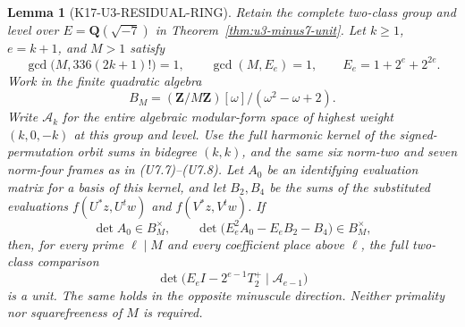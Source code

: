 \documentclass[11pt,a4paper]{article}
\newtheorem{lemma}[theorem]{Lemma}
\theoremstyle{definition}
\begin{document}
\begin{lemma}[K17-U3-RESIDUAL-RING]\label{lem:u3-residual-ring}
Retain the complete two-class group and level over
$E=\mathbf Q(\sqrt{-7})$ in Theorem~\ref{thm:u3-minus7-unit}.
Let $k\ge1$, $e=k+1$, and $M>1$ satisfy
\[
 \gcd\bigl(M,336(2k+1)!\bigr)=1,
 \qquad \gcd(M,E_e)=1,
 \qquad E_e=1+2^e+2^{2e}.
 \tag{UR.1}
\]
Work in the finite quadratic algebra
\[
 B_M=(\mathbf Z/M\mathbf Z)[\omega]/(\omega^2-\omega+2).
 \tag{UR.2}
\]
Write $\mathcal A_k$ for the entire algebraic modular-form space
of highest weight $(k,0,-k)$ at this group and level.
Use the full harmonic kernel of the signed-permutation orbit sums
in bidegree $(k,k)$, and the same six norm-two and seven norm-four
frames as in (U7.7)--(U7.8). Let $A_0$ be an identifying evaluation
matrix for a basis of this kernel, and let $B_2,B_4$ be the sums of
the substituted evaluations $f(U^*z,U^tw)$ and $f(V^*z,V^tw)$.
If
\[
 \det A_0\in B_M^\times,
 \qquad
 \det\bigl(E_e^2A_0-E_eB_2-B_4\bigr)\in B_M^\times,
 \tag{UR.3}
\]
then, for every prime $\ell\mid M$ and every coefficient place
above $\ell$, the full two-class comparison
\[
 \det\bigl(E_e I-2^{e-1}T_2^+
       \mid\mathcal A_{e-1}\bigr)
 \tag{UR.4}
\]
is a unit. The same holds in the opposite minuscule direction.
Neither primality nor squarefreeness of $M$ is required.
\end{lemma}
\end{document}

